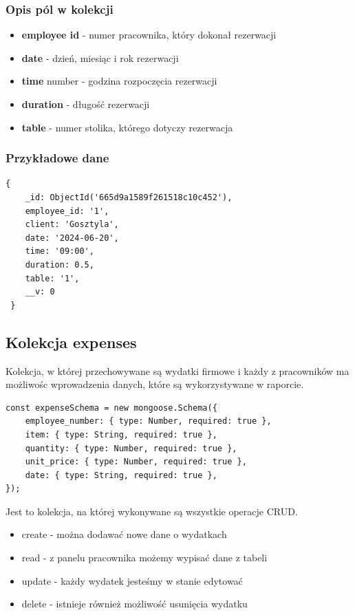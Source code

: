 \documentclass[12pt]{article}
\begin{document}
\subsubsection{Opis pól w kolekcji}

\begin{itemize}
	\item \textbf{employee id} - numer pracownika, który dokonał rezerwacji
	\item \textbf{date} - dzień, miesiąc i rok rezerwacji
	\item \textbf{time} number - godzina rozpoczęcia rezerwacji
	\item \textbf{duration} - długość rezerwacji
	\item \textbf{table} - numer stolika, którego dotyczy rezerwacja
\end{itemize}

\subsubsection{Przykładowe dane}
\begin{lstlisting}[]
 {
	_id: ObjectId('665d9a1589f261518c10c452'),
    employee_id: '1',
    client: 'Gosztyla',
    date: '2024-06-20',
    time: '09:00',
    duration: 0.5,
    table: '1',
    __v: 0
 }
\end{lstlisting}

\newpage
\begin{samepage}
\subsection{Kolekcja expenses}
Kolekcja, w której przechowywane są wydatki firmowe i każdy z pracowników ma możliwośc wprowadzenia danych, które są wykorzystywane w raporcie.
\begin{lstlisting}[caption={Expenses}]
const expenseSchema = new mongoose.Schema({
	employee_number: { type: Number, required: true },
	item: { type: String, required: true },
	quantity: { type: Number, required: true },
	unit_price: { type: Number, required: true },
	date: { type: String, required: true },
});
\end{lstlisting}
Jest to kolekcja, na której wykonywane są wszystkie operacje CRUD.
\begin{itemize}
	\item create - można dodawać nowe dane o wydatkach 
	\item read - z panelu pracownika możemy wypisać dane z tabeli
	\item update - każdy wydatek jesteśmy w stanie edytować
	\item delete - istnieje również możliwość usunięcia wydatku
\end{itemize}
\end{samepage}
\end{document}
